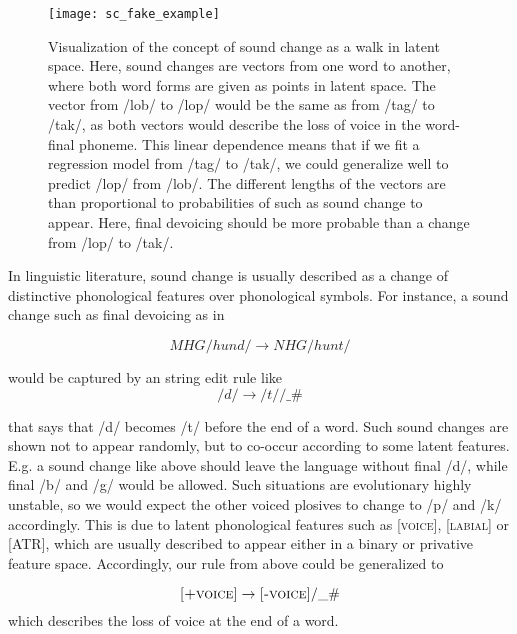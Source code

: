 \documentclass[8pt]{article}
\begin{document}
\begin{figure}[h]
\begin{center}
\texttt{[image: sc\_fake\_example]} 
\caption{Visualization of the concept of sound change as a walk in latent space. Here, sound changes are vectors from one word to another, where both word forms are given as points in latent space. The vector from /lob/ to /lop/ would be the same as from /tag/ to /tak/, as both vectors would describe the loss of voice in the word-final phoneme. This linear dependence means that if we fit a regression model from /tag/ to /tak/, we could generalize well to predict /lop/ from /lob/. The different lengths of the vectors are than proportional to probabilities of such as sound change to appear. Here, final devoicing should be more probable than a change from /lop/ to /tak/. }
\label{default}
\end{center}
\end{figure}
In linguistic literature, sound change is usually described as a change of distinctive phonological features over phonological symbols. For instance, a sound change such as final devoicing as in 

\begin{equation}
MHG /hund/ \rightarrow NHG /hunt/
\end{equation}

 would be captured by an string edit rule like
\begin{equation}
/d/ \rightarrow /t/ / \_ \#
\end{equation}

that says that /d/ becomes /t/ before the end of a word. Such sound changes are shown not to appear randomly, but to co-occur according to some latent features. E.g. a sound change like above should leave the language without final /d/, while final /b/ and /g/ would be allowed. Such situations are evolutionary highly unstable, so we would expect the other voiced plosives to change to /p/ and /k/ accordingly. This is due to latent phonological features such as \textsc{[voice]}, \textsc{[labial]} or \textsc{[ATR]}, which are usually described to appear either in a binary or privative feature space. Accordingly, our rule from above could be generalized to

\begin{equation}
\textsc{[+voice]} \rightarrow \textsc{[-voice]} / \_ \#
\label{eq:final_devoicing}
\end{equation}
which describes the loss of voice at the end of a word. 
\end{document}
